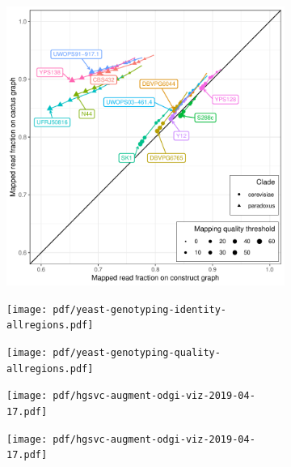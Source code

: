 \documentclass{article}
\begin{document}
\begin{figure}
\begin{subfigure}[b]{.5\textwidth}
    \includegraphics[width=\textwidth]{pdf/yeast-mapping-quality-all.pdf}
  \end{subfigure}
\end{figure}

\clearpage
\begin{figure}
  \begin{subfigure}[b]{.6\textwidth}
    \caption{}
    \texttt{[image: pdf/yeast-genotyping-identity-allregions.pdf]}
  \end{subfigure}
  \begin{subfigure}[b]{.4\textwidth}
    \caption{}
    \texttt{[image: pdf/yeast-genotyping-quality-allregions.pdf]}
  \end{subfigure}
\end{figure}

\clearpage
\begin{figure}
  \begin{subfigure}[b]{\textwidth}
    \caption{}
    \texttt{[image: pdf/hgsvc-augment-odgi-viz-2019-04-17.pdf]}
  \end{subfigure}
  \begin{subfigure}[b]{\textwidth}
    \caption{}
    \texttt{[image: pdf/hgsvc-augment-odgi-viz-2019-04-17.pdf]}
  \end{subfigure}
\end{figure}
\end{document}

